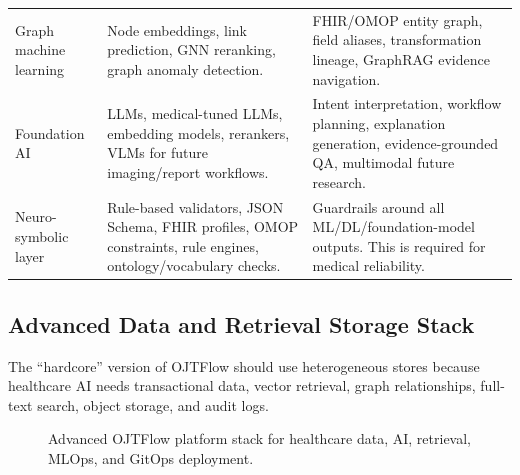 \begin{longtable}{p{}p{}p{}}
\addlinespace
Graph machine learning & Node embeddings, link prediction, GNN reranking, graph anomaly detection. & FHIR/OMOP entity graph, field aliases, transformation lineage, GraphRAG evidence navigation. \\
\addlinespace
Foundation AI & LLMs, medical-tuned LLMs, embedding models, rerankers, VLMs for future imaging/report workflows. & Intent interpretation, workflow planning, explanation generation, evidence-grounded QA, multimodal future research. \\
\addlinespace
Neuro-symbolic layer & Rule-based validators, JSON Schema, FHIR profiles, OMOP constraints, rule engines, ontology/vocabulary checks. & Guardrails around all ML/DL/foundation-model outputs. This is required for medical reliability. \\
\bottomrule
\end{longtable}

\subsection{Advanced Data and Retrieval Storage Stack}

The ``hardcore'' version of OJTFlow should use heterogeneous stores because healthcare AI needs transactional data, vector retrieval, graph relationships, full-text search, object storage, and audit logs.

\begin{figure}[H]
  \centering
  \resizebox{\textwidth}{!}{}
  \caption{Advanced OJTFlow platform stack for healthcare data, AI, retrieval, MLOps, and GitOps deployment.}
  \label{fig:platform-stack}
\end{figure}


